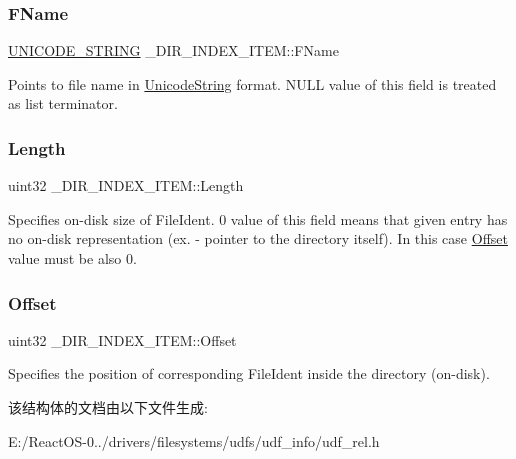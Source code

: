 \subsubsection{\texorpdfstring{F\+Name}{FName}}
{\footnotesize\ttfamily \hyperlink{struct___u_n_i_c_o_d_e___s_t_r_i_n_g}{U\+N\+I\+C\+O\+D\+E\+\_\+\+S\+T\+R\+I\+NG} \+\_\+\+D\+I\+R\+\_\+\+I\+N\+D\+E\+X\+\_\+\+I\+T\+E\+M\+::\+F\+Name}

Points to file name in \hyperlink{struct_unicode_string}{Unicode\+String} format. N\+U\+LL value of this field is treated as list terminator. \mbox{\label{struct___d_i_r___i_n_d_e_x___i_t_e_m_abcf8fd23d6cdd3d3520922ad1410bec4}} 
\subsubsection{\texorpdfstring{Length}{Length}}
{\footnotesize\ttfamily uint32 \+\_\+\+D\+I\+R\+\_\+\+I\+N\+D\+E\+X\+\_\+\+I\+T\+E\+M\+::\+Length}

Specifies on-\/disk size of File\+Ident. 0 value of this field means that given entry has no on-\/disk representation (ex. -\/ pointer to the directory itself). In this case \hyperlink{struct___d_i_r___i_n_d_e_x___i_t_e_m_a480bf65324d876039f63158fb0bd3eb7}{Offset} value must be also 0. \mbox{\label{struct___d_i_r___i_n_d_e_x___i_t_e_m_a480bf65324d876039f63158fb0bd3eb7}} 
\subsubsection{\texorpdfstring{Offset}{Offset}}
{\footnotesize\ttfamily uint32 \+\_\+\+D\+I\+R\+\_\+\+I\+N\+D\+E\+X\+\_\+\+I\+T\+E\+M\+::\+Offset}

Specifies the position of corresponding File\+Ident inside the directory (on-\/disk). 

该结构体的文档由以下文件生成\+:\begin{DoxyCompactItemize}
\item 
E\+:/\+React\+O\+S-\/0../drivers/filesystems/udfs/udf\+\_\+info/udf\+\_\+rel.\+h\end{DoxyCompactItemize}
